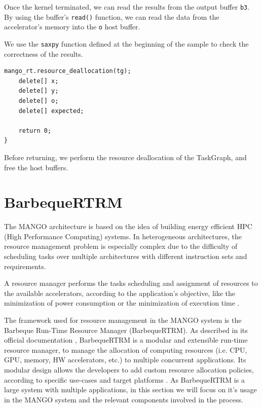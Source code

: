 Once the kernel terminated, we can read the results from the output buffer \texttt{b3}. By using the buffer's \texttt{read()} function, we can read the data from the accelerator's memory into the \texttt{o} host buffer.

We use the \texttt{saxpy} function defined at the beginning of the sample to check the correctness of the results.

\begin{lstlisting}[style=CStyle, caption=Sample - Teardown]
    mango_rt.resource_deallocation(tg);
    delete[] x;
    delete[] y;
    delete[] o;
    delete[] expected;

    return 0;
}
\end{lstlisting}

Before returning, we perform the resource deallocation of the TaskGraph, and free the host buffers.

\section{BarbequeRTRM}

The MANGO architecture is based on the idea of building energy efficient HPC (High Performance Computing) systems. In heterogeneous architectures, the resource management problem is especially complex due to the difficulty of scheduling tasks over multiple architectures with different instruction sets and requirements.

A resource manager performs the tasks scheduling and assignment of resources to the available accelerators, according to the application's objective, like the minimization of power consumption or the minimization of execution time \cite{mango_exploring_manycore_architectures}.

The framework used for resource management in the MANGO system is the Barbeque Run-Time Resource Manager (BarbequeRTRM). 
As described in its official documentation \cite{bosp}, BarbequeRTRM is a modular and extensible run-time resource manager, to manage the allocation of computing resources (i.e. CPU, GPU, memory, HW accelerators, etc.) to multiple concurrent applications. Its modular design allows the developers to add custom resource allocation policies, according to specific use-cases and target platforms \cite{barbecue_1}\cite{barbecue_2}. As BarbequeRTRM is a large system with multiple applications, in this section we will focus on it's usage in the MANGO system and the relevant components involved in the process.

